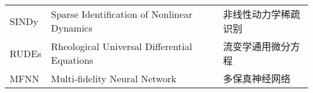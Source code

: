 \begin{longtable}{lll}
	SINDy    & Sparse Identification of Nonlinear Dynamics        & 非线性动力学稀疏识别\tabularnewline
	RUDEs    & Rheological Universal Differential Equations       & 流变学通用微分方程\tabularnewline
	MFNN     & Multi-fidelity Neural Network                      & 多保真神经网络\tabularnewline
\end{longtable}